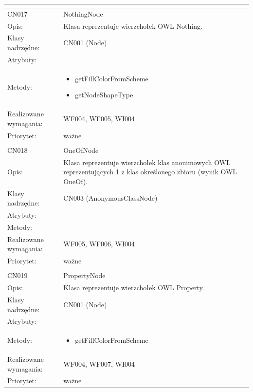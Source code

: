 \documentclass[a4paper,10pt]{article}
\begin{document}
\begin{center}
\begin{longtable}{|m{3cm}|m{9cm}|}
\multicolumn{2}{c}{} \\
 \hline

CN017 & NothingNode \\ \hline
Opis: & Klasa reprezentuje wierzchołek OWL Nothing.    \\ \hline
Klasy nadrzędne: & CN001 (Node)       \\ \hline
Atrybuty: & %
 \\ \hline
Metody: & \begin{itemize}
 \item getFillColorFromScheme
 \item getNodeShapeType
\end{itemize}
  \\ \hline
Realizowane wymagania: & WF004, WF005, WI004 \\ \hline
Priorytet: & ważne  \\ \hline

\multicolumn{2}{c}{} \\
 \hline

CN018 & OneOfNode \\ \hline
Opis: & Klasa reprezentuje wierzchołek klas anonimowych OWL reprezentujących 1 z klas określonego zbioru (wynik OWL OneOf).    \\ \hline
Klasy nadrzędne: & CN003 (AnonymousClassNode)     \\ \hline
Atrybuty: & %
 \\ \hline
Metody: & %
  \\ \hline
Realizowane wymagania: & WF005, WF006, WI004 \\ \hline
Priorytet: & ważne  \\ \hline

\multicolumn{2}{c}{} \\
 \hline

CN019 & PropertyNode \\ \hline
Opis: & Klasa reprezentuje wierzchołek OWL Property.    \\ \hline
Klasy nadrzędne: & CN001 (Node)       \\ \hline
Atrybuty: & %
 \\ \hline
Metody: & \begin{itemize}
 \item getFillColorFromScheme
\end{itemize}
  \\ \hline
Realizowane wymagania: & WF004, WF007, WI004 \\ \hline
Priorytet: & ważne  \\ \hline


\end{longtable}
\end{center}
\end{document}
